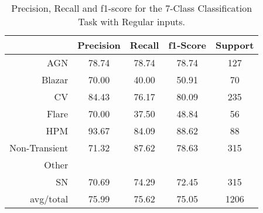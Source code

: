 \begin{table}
\centering
\begin{tabular}{|r|c|c|c|c|}
\hline
\multicolumn{1}{|l|}{} & Precision & Recall & f1-Score & Support \\ \hline \hline
AGN                    & 78.74              & 78.74             & 78.74             & 127             \\ \hline
Blazar                 & 70.00           & 40.00          & 50.91          & 70          \\ \hline
CV                     & 84.43               & 76.17              & 80.09              & 235              \\ \hline
Flare                  & 70.00            & 37.50           & 48.84           & 56           \\ \hline
HPM                    & 93.67              & 84.09             & 88.62             & 88             \\ \hline
Non-Transient          & 71.32    & 87.62   & 78.63   & 315   \\ \hline
Other                  &             &            &            &            \\ \hline
SN                     & 70.69               & 74.29              & 72.45              & 315              \\ \hline
avg/total              & 75.99            & 75.62           & 75.05           & 1206           \\ \hline
\end{tabular}
\caption{Precision, Recall and f1-score for the 7-Class Classification Task with Regular inputs.}
\label{Overall-Scores-7-Class-Regular}
\end{table}
